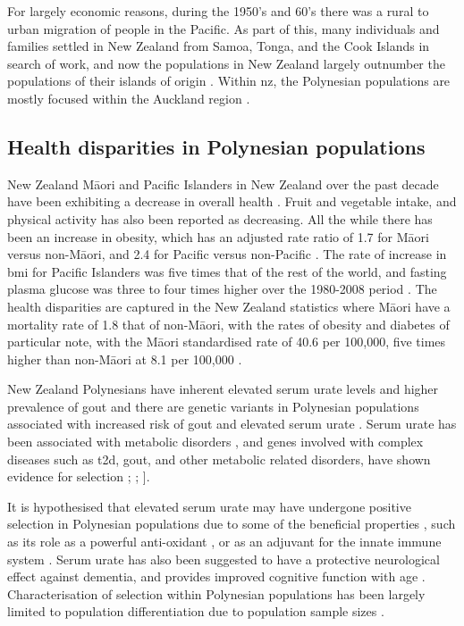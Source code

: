 \documentclass[]{report}
\newcommand{\tex}[1]{#1}
\begin{document}
For largely economic reasons, during the 1950's and 60's there was a
rural to urban migration of people in the Pacific. As part of this, many
individuals and families settled in New Zealand from Samoa, Tonga, and
the Cook Islands in search of work, and now the populations in New
Zealand largely outnumber the populations of their islands of origin
\citep{MatisooSmith2012highway}. Within \gls{nz}, the Polynesian
populations are mostly focused within the Auckland region
\citep{Barcham2009}.

\subsection{Health disparities in Polynesian
populations}\label{health-disparities-in-polynesian-populations}

New Zealand M\tex{\={a}}ori and Pacific Islanders in New Zealand over
the past decade have been exhibiting a decrease in overall health
\citep{MinistryofHealth2016}. Fruit and vegetable intake, and physical
activity has also been reported as decreasing. All the while there has
been an increase in obesity, which has an adjusted rate ratio of 1.7 for
M\tex{\={a}}ori versus non-M\tex{\={a}}ori, and 2.4 for Pacific versus
non-Pacific \citep{MinistryofHealth2016}. The rate of increase in
\gls{bmi} for Pacific Islanders was five times that of the rest of the
world, and fasting plasma glucose was three to four times higher over
the 1980-2008 period \citep{Hawley2015}. The health disparities are
captured in the New Zealand statistics where M\tex{\={a}}ori have a
mortality rate of 1.8 that of non-M\tex{\={a}}ori, with the rates of
obesity and diabetes of particular note, with the M\tex{\={a}}ori
standardised rate of 40.6 per 100,000, five times higher than
non-M\tex{\={a}}ori at 8.1 per 100,000 \citep{MinistryofHealth2012}.

New Zealand Polynesians have inherent elevated serum urate levels and
higher prevalence of gout \citep{Winnard2012, Winnard2013} and there are
genetic variants in Polynesian populations associated with increased
risk of gout and elevated serum urate
\citep{Phipps-Green2010, Phipps-Green2016}. Serum urate has been
associated with metabolic disorders \citep{Choi2007, Choi2007b}, and
genes involved with complex diseases such as \gls{t2d}, gout, and other
metabolic related disorders, have shown evidence for selection
\citet{Hancock2008}; \citet{pickrell2009signals}; \citet{Zhang2013a}{]}.

It is hypothesised that elevated serum urate may have undergone positive
selection in Polynesian populations due to some of the beneficial
properties \citep{Gosling2014}, such as its role as a powerful
anti-oxidant \citep{Ames1981}, or as an adjuvant for the innate immune
system \citep{Opitz2009}. Serum urate has also been suggested to have a
protective neurological effect against dementia, and provides improved
cognitive function with age \citep{Euser2009}. Characterisation of
selection within Polynesian populations has been largely limited to
population differentiation due to population sample sizes
\citep{Kimura2008, Mallick2016}.
\end{document}
